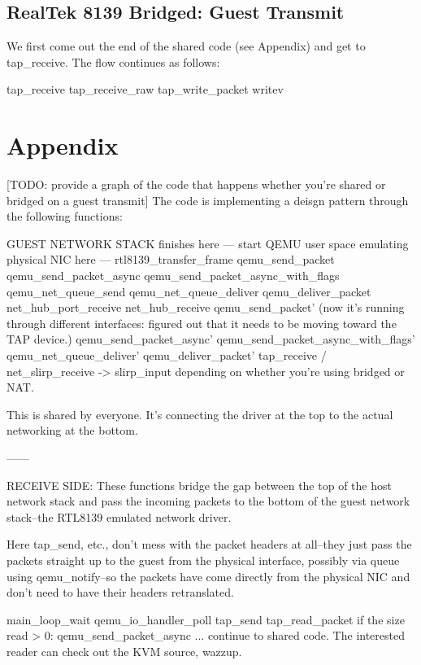 \documentclass[11pt,pdftex,twocolumn]{article}
\begin{document}
\subsection{RealTek 8139 Bridged: Guest Transmit}
We first come out the end of the shared code (see Appendix) and get to tap_receive. The flow continues as follows:

tap_receive
tap_receive_raw
tap_write_packet
writev 


%
%
%
%
%

\section{Appendix}

[TODO: provide a graph of the code that happens whether you're shared or bridged on a guest transmit]
The code is implementing a deisgn pattern through the following functions: 

GUEST NETWORK STACK finishes here
--- start QEMU user space emulating physical NIC here ---
rtl8139_transfer_frame 
qemu_send_packet
qemu_send_packet_async
qemu_send_packet_async_with_flags
qemu_net_queue_send
qemu_net_queue_deliver
qemu_deliver_packet
net_hub_port_receive
net_hub_receive
qemu_send_packet' (now it's running through different interfaces: figured out that it needs to be moving toward the TAP device.)
qemu_send_packet_async'
qemu_send_packet_async_with_flags'
qemu_net_queue_deliver'
qemu_deliver_packet'
tap_receive / net_slirp_receive -> slirp_input depending on whether you're using bridged or NAT.

This is shared by everyone. It's connecting the driver at the top to the actual networking at the bottom. 

------

RECEIVE SIDE:
These functions bridge the gap between the top of the host network stack and pass the incoming packets to the bottom of the guest network stack--the RTL8139 emulated network driver. 

Here tap_send, etc., don't mess with the packet headers at all--they just pass the packets straight up to the guest from the physical interface, possibly via queue using qemu_notify--so the packets have come directly from the physical NIC and don't need to have their headers retranslated.

main_loop_wait
qemu_io_handler_poll
tap_send
tap_read_packet
if the size read > 0:
	qemu_send_packet_async
... continue to shared code. The interested reader can check out the KVM source, wazzup.
\end{document}
